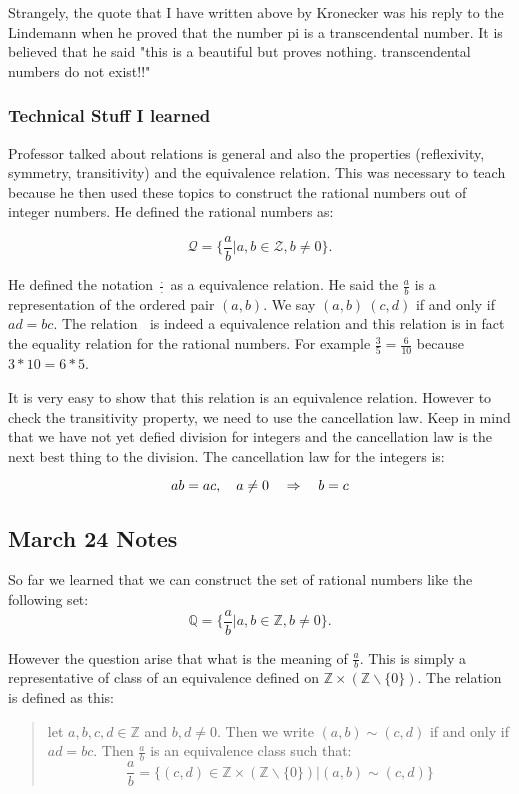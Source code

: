 Strangely, the quote that I have written above by Kronecker was his reply to the Lindemann when he proved that the number pi is a transcendental number. It is believed that he said "this is a beautiful but proves nothing. transcendental numbers do not exist!!"


\subsubsection{Technical Stuff I learned}

Professor talked about relations is general and also the properties (reflexivity, symmetry, transitivity) and the equivalence relation. This was necessary to teach because he then used these topics to construct the rational numbers out of integer numbers. He defined the rational numbers as:

\[ \mathcal{Q} = \{ \frac{a}{b} | a,b \in \mathcal{Z}, b \neq 0 \}. \]

He defined the notation $ \frac{\cdot}{\cdot} $ as a equivalence relation. He said the $ \frac{a}{b} $ is a representation of the ordered pair $ (a,b) $. We say $ (a,b) ~ (c,d) $ if and only if $ ad = bc $. The relation $ ~ $ is indeed a equivalence relation and this relation is in fact the equality relation for the rational numbers. For example $ \frac{3}{5} = \frac{6}{10} $ because $ 3*10 = 6*5 $.

It is very easy to show that this relation is an equivalence relation. However to check the transitivity property, we need to use the cancellation law. Keep in mind that we have not yet defied division for integers and the cancellation law is the next best thing to the division. The cancellation law for the integers is:

\[ ab = ac, \quad a \neq 0 \quad \Rightarrow \quad b=c \]


\subsection{March 24 Notes}

So far we learned that we can construct the set of rational numbers like the following set:
\[ \mathbb{Q} = \{ \frac{a}{b} | a,b \in \mathbb{Z}, b \neq 0 \}. \]

However the question arise that what is the meaning of $ \frac{a}{b} $. This is simply a representative of class of an equivalence defined on $ \mathbb{Z} \times (\mathbb{Z}\backslash\{0\})$. The relation is defined as this:
\begin{quote}
	let $ a,b,c,d \in \mathbb{Z} $ and $ b,d \neq 0 $. Then we write $ (a,b) \sim (c,d) $ if and only if $ ad = bc $. Then $ \frac{a}{b} $ is an equivalence class such that: \[ \frac{a}{b} = \{ (c,d) \in \mathbb{Z} \times (\mathbb{Z}\backslash\{0\}) | (a,b) \sim (c,d) \} \]
\end{quote}

